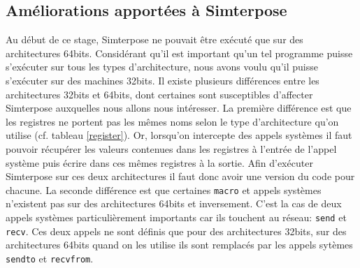 \subsection{Améliorations apportées à Simterpose}

Au début de ce stage, Simterpose ne pouvait être exécuté que sur des architectures 64bits. Considérant qu'il est important qu'un tel programme puisse s'exécuter sur tous les types d'architecture, nous avons voulu qu'il puisse s'exécuter sur des machines 32bits. Il existe plusieurs différences entre les architectures 32bits et 64bits, dont certaines sont susceptibles d'affecter Simterpose auxquelles nous allons nous intéresser. La première différence est que les registres ne portent pas les mêmes noms selon le type d'architecture qu'on utilise (cf. tableau \ref{register}). Or, lorsqu'on intercepte des appels systèmes il faut pouvoir récupérer les valeurs contenues dans les registres à l'entrée de l'appel système puis écrire dans ces mêmes registres à la sortie. Afin d'exécuter Simterpose sur ces deux architectures il faut donc avoir une version du code pour chacune. La seconde différence est que certaines \texttt{macro} et appels systèmes n'existent pas sur des architectures 64bits et inversement. C'est la cas de deux appels systèmes particulièrement importants car ils touchent au réseau: \texttt{send} et \texttt{recv}. Ces deux appels ne sont définis que pour des architectures 32bits, sur des architectures 64bits quand on les utilise ils sont remplacés par les appels sytèmes \texttt{sendto} et \texttt{recvfrom}.

